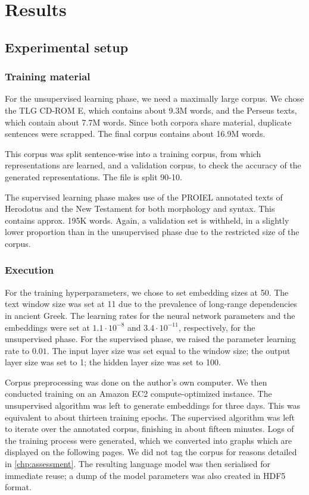\chapter{Results}
\label{chp:results}

\section{Experimental setup}
\label{sec:computationtime}
\subsection{Training material}
\label{sec:trainingmaterial}
For the unsupervised learning phase, we need a maximally large
corpus. We chose the TLG CD-ROM E, which contains about 9.3M words, and
the Perseus texts, which contain about 7.7M words. Since both corpora
share material, duplicate sentences were scrapped. The final corpus
contains about 16.9M words.

This corpus was split sentence-wise into a training corpus, from which
representations are learned, and a validation corpus, to check the
accuracy of the generated representations. The file is split 90-10.

The supervised learning phase makes use of the PROIEL annotated texts
of Herodotus and the New Testament for both morphology and
syntax. This contains approx. 195K words. Again, a validation set is
withheld, in a slightly lower proportion than in the unsupervised
phase due to the restricted size of the corpus.
\subsection{Execution}
\label{sec:execution}
For the training hyperparameters, we chose to set embedding sizes at
50. The text window size was set at 11 due to the prevalence of
long-range dependencies in ancient Greek. The learning rates for the
neural network parameters and the embeddings were set at $1.1 \cdot
10^{-8}$ and $3.4 \cdot 10^{-11}$, respectively, for the unsupervised
phase. For the supervised phase, we raised the parameter learning rate
to $0.01$. The input layer size was set equal to the window size; the
output layer size was set to 1; the hidden layer size was set to 100.

Corpus preprocessing was done on the author's own computer. We then
conducted training on an Amazon EC2 compute-optimized instance. The
unsupervised algorithm was left to generate embeddings for three days.
This was equivalent to about thirteen training epochs. The supervised
algorithm was left to iterate over the annotated corpus, finishing in
about fifteen minutes. Logs of the training process were generated,
which we converted into graphs which are displayed on the following
pages. We did not tag the corpus for reasons detailed in
\ref{chp:assessment}. The resulting language model was then serialised
for immediate reuse; a dump of the model parameters was also created
in HDF5 format.
